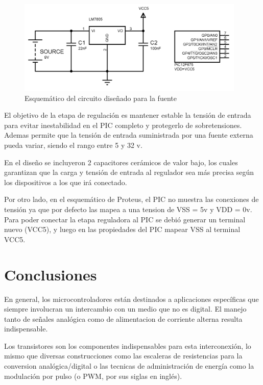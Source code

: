 \documentclass[a4paper]{article}
\newenvironment{ejercicios}
    {\setcounter{secnumdepth}{3}
    \renewcommand\thesubsection{Ejercicio \arabic{subsection}}}
    {\setcounter{secnumdepth}{0}}
\begin{document}
\begin{ejercicios}
    \begin{figure}[h]\centering
        \includegraphics[height=4.5cm]{esquematico3.png}
        \caption{Esquemático del circuito diseñado para la fuente}
        \label{fig:regulador}
    \end{figure}

    El objetivo de la etapa de regulación es mantener estable la tensión de entrada 
    para evitar inestabilidad en el PIC completo y protegerlo de sobretensiones. Ademas permite 
    que la tensión de entrada suministrada por una fuente externa pueda variar, siendo el rango entre 5 y 32 v.

    En el diseño se incluyeron 2 capacitores cerámicos de valor bajo, los cuales garantizan que la carga y 
    tensión de entrada al regulador sea más precisa según los dispositivos a los que irá conectado.

    Por otro lado, en el esquemático de Proteus, el PIC no muestra las conexiones de tensión ya que por defecto
    las mapea a una tension de VSS = 5v y VDD = 0v. Para poder conectar la etapa reguladora al PIC se debió
    generar un terminal nuevo (VCC5), y luego en las propiedades del PIC mapear VSS al terminal VCC5.

\end{ejercicios}


\section{Conclusiones}

En general, los microcontroladores están destinados a aplicaciones
específicas que siempre involucran un intercambio con un medio que 
no es digital. El manejo tanto de señales analógica como de 
alimentacion de corriente alterna resulta indispensable.

Los transistores son los componentes indispensables para esta 
interconexión, lo mismo que diversas construcciones como las 
escaleras de resistencias para la conversion analógica/digital
o las tecnicas de administración de energía como la modulación
por pulso (o PWM, por sus siglas en inglés).
\end{document}
